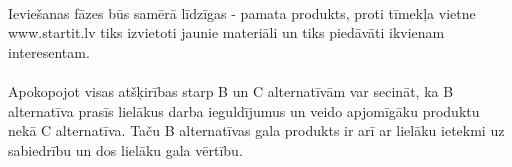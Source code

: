 \paragraph{}
Ieviešanas fāzes būs samērā līdzīgas - pamata produkts, proti tīmekļa vietne www.startit.lv tiks izvietoti jaunie materiāli un
tiks piedāvāti ikvienam interesentam.
\paragraph{}
Apokopojot visas atšķirības starp B un C alternatīvām var secināt, ka B alternatīva prasīs lielākus darba ieguldījumus un veido
apjomīgāku produktu nekā C alternatīva. Taču B alternatīvas gala produkts ir arī ar lielāku ietekmi uz sabiedrību un dos lielāku
gala vērtību.
